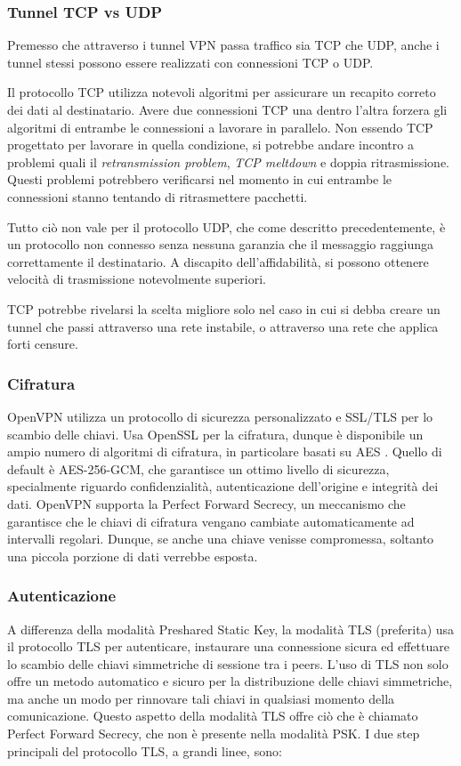 \subsubsection{Tunnel TCP vs UDP}
Premesso che attraverso i tunnel VPN passa traffico sia TCP che UDP, anche i tunnel stessi possono essere realizzati con connessioni TCP o UDP.

Il protocollo TCP utilizza notevoli algoritmi per assicurare un recapito correto dei dati al destinatario. Avere due connessioni TCP una dentro l'altra forzera gli algoritmi di entrambe le connessioni a lavorare in parallelo. Non essendo TCP progettato per lavorare in quella condizione, si potrebbe andare incontro a problemi quali il \emph{retransmission problem}, \emph{TCP meltdown} e doppia ritrasmissione. Questi problemi potrebbero verificarsi nel momento in cui entrambe le connessioni stanno tentando di ritrasmettere pacchetti.

Tutto ciò non vale per il protocollo UDP, che come descritto precedentemente, è un protocollo non connesso senza nessuna garanzia che il messaggio raggiunga correttamente il destinatario. A discapito dell'affidabilità, si possono ottenere velocità di trasmissione notevolmente superiori.

TCP potrebbe rivelarsi la scelta migliore solo nel caso in cui si debba creare un tunnel che passi attraverso una rete instabile, o attraverso una rete che applica forti censure.

\subsubsection{Cifratura}
OpenVPN utilizza un protocollo di sicurezza personalizzato e SSL/TLS per lo scambio delle chiavi. Usa OpenSSL per la cifratura, dunque è disponibile un ampio numero di algoritmi di cifratura, in particolare basati su AES \cite[RFC3826]{RFC3826}. Quello di default è AES-256-GCM, che garantisce un ottimo livello di sicurezza, specialmente riguardo confidenzialità, autenticazione dell'origine e integrità dei dati.
OpenVPN supporta la Perfect Forward Secrecy, un meccanismo che garantisce che le chiavi di cifratura vengano cambiate automaticamente ad intervalli regolari. Dunque, se anche una chiave venisse compromessa, soltanto una piccola porzione di dati verrebbe esposta.

\subsubsection{Autenticazione}
A differenza della modalità Preshared Static Key, la modalità TLS (preferita) usa il protocollo TLS per autenticare, instaurare una connessione sicura ed effettuare lo scambio delle chiavi simmetriche di sessione tra i peers. L'uso di TLS non solo offre un metodo automatico e sicuro per la distribuzione delle chiavi simmetriche, ma anche un modo per rinnovare tali chiavi in qualsiasi momento della comunicazione.
Questo aspetto della modalità TLS offre ciò che è chiamato Perfect Forward Secrecy, che non è presente nella modalità PSK.
I due step principali del protocollo TLS, a grandi linee, sono:

